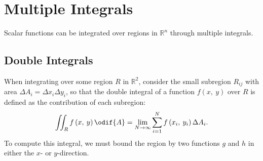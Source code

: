 \documentclass{article}
\begin{document}
\section{Multiple Integrals}
Scalar functions can be integrated over regions in \(\mathbb{R}^n\)
through multiple integrals.
\subsection{Double Integrals}
When integrating over some region \(R\) in \(\mathbb{R}^2\), consider
the small subregion \(R_{ij}\) with area \(\Delta A_i = \Delta x_i
\Delta y_i\), so that the double integral of a function \(f\left( x, \:
y \right)\) over \(R\) is defined as the contribution of each
subregion:
\begin{equation*}
    \iint_{R} f\left( x, \: y \right) \odif{A} = \lim_{N \to \infty} \sum_{i=1}^{N} f\left( x_i, \: y_i \right) \Delta A_i.
\end{equation*}
To compute this integral, we must bound the region by two functions
\(g\) and \(h\) in either the \(x\)- or \(y\)-direction.
\end{document}
